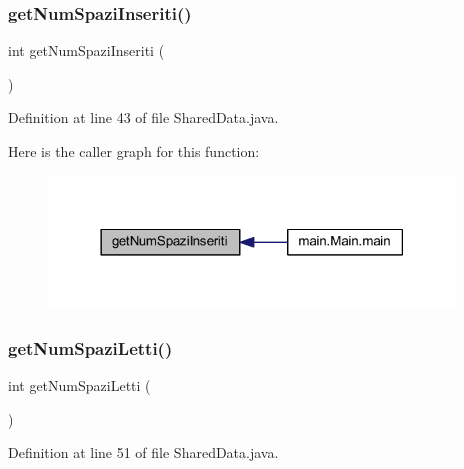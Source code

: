 \subsubsection{\texorpdfstring{get\+Num\+Spazi\+Inseriti()}{getNumSpaziInseriti()}}
{\footnotesize\ttfamily int get\+Num\+Spazi\+Inseriti (\begin{DoxyParamCaption}{ }\end{DoxyParamCaption})}



Definition at line 43 of file Shared\+Data.\+java.

Here is the caller graph for this function\+:
\nopagebreak
\begin{figure}[H]
\begin{center}
\leavevmode
\includegraphics[width=306pt]{classmain_1_1_shared_data_adc76b1379d370fdffb139d532a622360_icgraph}
\end{center}
\end{figure}
\mbox{\label{classmain_1_1_shared_data_a54eb961c8dee642d24f9e725eb039827}} 
\subsubsection{\texorpdfstring{get\+Num\+Spazi\+Letti()}{getNumSpaziLetti()}}
{\footnotesize\ttfamily int get\+Num\+Spazi\+Letti (\begin{DoxyParamCaption}{ }\end{DoxyParamCaption})}



Definition at line 51 of file Shared\+Data.\+java.

